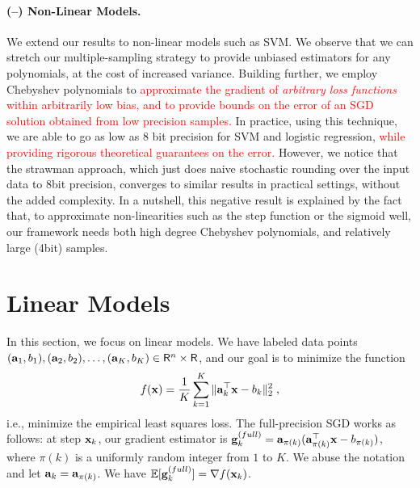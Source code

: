 \documentclass{article}
\newcommand{\R}{\mathsf{R}}
\def\a{{\bf a}}
\def\g{{\bf g}}
\def\x{{\bf x}}
\def\E{\mathbb{E}}
\begin{document}
\paragraph{(--) Non-Linear Models.} We extend our
results to non-linear models such as SVM. We observe that 
we can stretch our multiple-sampling strategy to provide 
unbiased estimators for any polynomials, at the cost of increased variance. 
Building further, we employ Chebyshev polynomials to   
\textcolor{red}{
approximate the gradient of \emph{arbitrary loss functions} within arbitrarily low bias, 
and to provide bounds on the error of an SGD solution obtained from low precision samples. }
%
%
In practice, using this technique, we are
able to go as low as 8 bit precision for SVM and logistic regression, \textcolor{red}{while providing 
rigorous theoretical guarantees on the error.} However, we notice that the strawman approach, which just
does naive stochastic rounding over the input data to 8bit precision, converges to similar results in practical settings, 
without the added complexity. 
In a nutshell, this negative result is explained by the fact that, to approximate non-linearities such as the step function or the sigmoid well, our framework needs both high degree Chebyshev polynomials, and relatively large (4bit) samples. 



\vspace{-0.5em}
\section{Linear Models}

\vspace{-0.5em}
In this section, we focus on linear models.
We have labeled data points $(\a_1, b_1), (\a_2, b_2), \ldots, (\a_K, b_K) \in \R^n \times \R$, and our goal is to minimize the function
\[
f(\x) = \frac{1}{K} \sum_{k = 1}^K \| \a_k^\top \x - b_k \|_2^2 \; ,
\]
i.e., minimize the empirical least squares loss.
The full-precision SGD works as 
follows: at step $\x_k$, our gradient estimator is $\g_k^{(full)} = \a_{\pi(k)} (\a_{\pi(k)}^\top \x - b_{\pi(k)})$, where $\pi(k)$ is a uniformly random integer from $1$ to $K$.
We abuse the notation and let $\a_k = \a_{\pi(k)}$.
We have $\E [\g_k^{(full)}] = \nabla f(\x_k)$.
\end{document}
